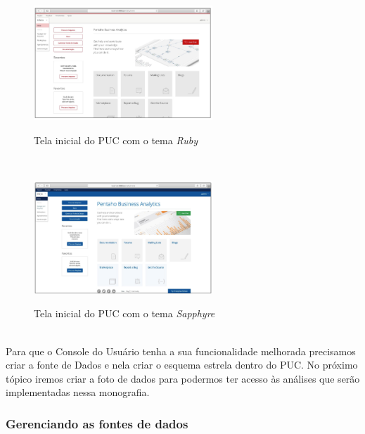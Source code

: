\begin{figure}[H]
	\vspace*{0,2cm}
    \centering
    \caption{Tela inicial do PUC com o tema \textit{Ruby}}
    \includegraphics[width=0.6\textwidth]{./04-figuras/figura-puc-tema-ruby}
    \label{fig:ilustfigpuctemaruby}
\end{figure}
\vspace*{-0,9cm}
{\raggedright {}} \\

\begin{figure}[H]
	\vspace*{0,2cm}
    \centering
    \caption{Tela inicial do PUC com o tema \textit{Sapphyre}}
    \includegraphics[width=0.6\textwidth]{./04-figuras/figura-puc-tema-sapphyre}
    \label{fig:ilustfigpuctemasapphyre}
\end{figure}
\vspace*{-0,9cm}
{\raggedright {}} \\

Para que o Console do Usu\'{a}rio tenha a sua funcionalidade melhorada precisamos criar a 
fonte de Dados e nela criar o esquema estrela dentro do PUC. No pr\'{o}ximo t\'{o}pico iremos criar a 
foto de dados para podermos ter acesso às an\'{a}lises que ser\~{a}o implementadas nessa monografia.

\subsubsection{Gerenciando as fontes de dados}

